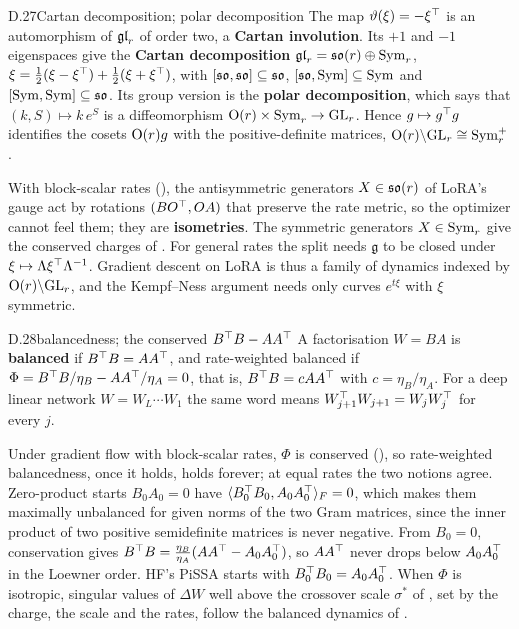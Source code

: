 \begin{bgentry}{D.27}{Cartan decomposition; polar decomposition}
The map $\vartheta(\xi)=-\xi^{\top}$ is an automorphism of $\mathfrak{gl}_r$ of order two, a \textbf{Cartan involution}. Its $+1$ and
$-1$ eigenspaces give the \textbf{Cartan decomposition} $\mathfrak{gl}_r=\mathfrak{so}(r)\oplus\mathrm{Sym}_r$,
$\xi=\tfrac12(\xi-\xi^{\top})+\tfrac12(\xi+\xi^{\top})$, with $[\mathfrak{so},\mathfrak{so}]\subseteq\mathfrak{so}$, $[\mathfrak{so},\mathrm{Sym}]\subseteq\mathrm{Sym}$ and
$[\mathrm{Sym},\mathrm{Sym}]\subseteq\mathfrak{so}$. Its group version is the \textbf{polar decomposition}, which says that $(k,S)\mapsto
k\,e^{S}$ is a diffeomorphism $\mathrm{O}(r)\times\mathrm{Sym}_r\to\mathrm{GL}_r$. Hence $g\mapsto g^{\top} g$ identifies the cosets $\mathrm{O}(r)g$
with the positive-definite matrices, $\mathrm{O}(r)\backslash\mathrm{GL}_r\cong\mathrm{Sym}^+_r$.
\end{bgentry}

With block-scalar rates (), the antisymmetric generators $X\in\mathfrak{so}(r)$ of LoRA's gauge act by rotations
$(BO^{\top},OA)$ that preserve the rate metric, so the optimizer cannot feel them; they are \textbf{isometries}. The
symmetric generators $X\in\mathrm{Sym}_r$ give the conserved charges of . For general rates the split needs
$\mathfrak g$ to be closed under $\xi\mapsto\Lambda\xi^{\top}\Lambda^{-1}$. Gradient descent on LoRA is thus a family of
dynamics indexed by $\mathrm{O}(r)\backslash\mathrm{GL}_r$, and the Kempf--Ness argument needs only curves $e^{t\xi}$ with $\xi$
symmetric.


\begin{bgentry}{D.28}{balancedness; the conserved $B^{\top} B-AA^{\top}$}
A factorisation $W=BA$ is \textbf{balanced} if $B^{\top} B=AA^{\top}$, and rate-weighted balanced if $\Phi=B^{\top}
B/\eta_B-AA^{\top}/\eta_A=0$, that is, $B^{\top} B=cAA^{\top}$ with $c=\eta_B/\eta_A$. For a deep linear network $W=W_L\cdots W_1$ the
same word means $W_{j+1}^{\top} W_{j+1}=W_jW_j^{\top}$ for every $j$.
\end{bgentry}

Under gradient flow with block-scalar rates, $\Phi$ is conserved (), so rate-weighted balancedness, once it
holds, holds forever; at equal rates the two notions agree. Zero-product starts $B_0A_0=0$ have $\langle B_0^{\top}
B_0,A_0A_0^{\top}\rangle_F=0$, which makes them maximally unbalanced for given norms of the two Gram matrices, since the
inner product of two positive semidefinite matrices is never negative. From $B_0=0$, conservation gives $B^{\top}
B=\tfrac{\eta_B}{\eta_A}(AA^{\top}-A_0A_0^{\top})$, so $AA^{\top}$ never drops below $A_0A_0^{\top}$ in the Loewner order. HF's PiSSA starts
with $B_0^{\top} B_0=A_0A_0^{\top}$. When $\Phi$ is isotropic, singular values of $\Delta W$ well above the crossover scale
$\sigma^*$ of , set by the charge, the scale and the rates, follow the balanced dynamics of
\citet{arora2018optimization}.

